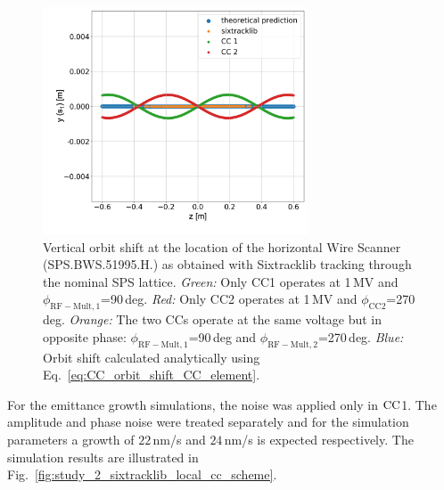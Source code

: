 \begin{figure}[!h]
    \centering         
    \includegraphics[width=0.7\textwidth]{images/Ch6/Vcc_orbit_shift_CC1_CC2.png}
        \caption{Vertical orbit shift at the location of the horizontal Wire Scanner (SPS.BWS.51995.H.) as obtained with Sixtracklib tracking through the nominal SPS lattice. \textit{Green:} Only CC1 operates at 1\,MV and $\phi_\mathrm{RF-Mult, 1}$=90\,deg. \textit{Red:} Only CC2 operates at 1\,MV and $\phi_\mathrm{CC2}$=270\,deg. \textit{Orange:} The two CCs operate at the same voltage but in opposite phase: $\phi_\mathrm{RF-Mult, 1}$=90\,deg and  $\phi_\mathrm{RF-Mult, 2}$=270\,deg. \textit{Blue:} Orbit shift calculated analytically using Eq.~\eqref{eq:CC_orbit_shift_CC_element}.}
        \label{fig:sixtracklib_CC1_vs_CC2_orbit_shift_vs_theory}
\end{figure}

For the emittance growth simulations, the noise was applied only in ${\mathrm{CC}}$1. The amplitude and phase noise were treated separately and for the simulation parameters a growth of $22$\,nm/s and $24$\,nm/s is expected respectively. The simulation results are illustrated in Fig.~\ref{fig:study_2_sixtracklib_local_cc_scheme}.

